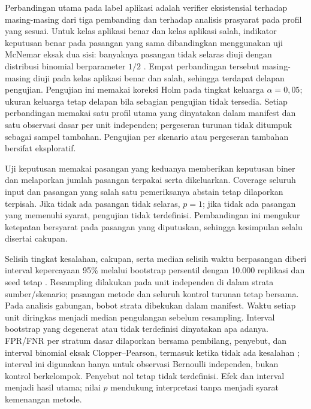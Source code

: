 Perbandingan utama pada label aplikasi adalah verifier eksistensial terhadap masing-masing dari tiga pembanding dan terhadap analisis prasyarat pada profil yang sesuai. Untuk kelas aplikasi benar dan kelas aplikasi salah, indikator keputusan benar pada pasangan yang sama dibandingkan menggunakan uji McNemar eksak dua sisi: banyaknya pasangan tidak selaras diuji dengan distribusi binomial berparameter $1/2$ \citep{rstats2026,rbinom2026}. Empat perbandingan tersebut masing-masing diuji pada kelas aplikasi benar dan salah, sehingga terdapat delapan pengujian. Pengujian ini memakai koreksi Holm pada tingkat keluarga $\alpha=0{,}05$; ukuran keluarga tetap delapan bila sebagian pengujian tidak tersedia. Setiap perbandingan memakai satu profil utama yang dinyatakan dalam manifest dan satu observasi dasar per unit independen; pergeseran turunan tidak ditumpuk sebagai sampel tambahan. Pengujian per skenario atau pergeseran tambahan bersifat eksploratif.

Uji keputusan memakai pasangan yang keduanya memberikan keputusan biner dan melaporkan jumlah pasangan terpakai serta dikeluarkan. Coverage seluruh input dan pasangan yang salah satu pemeriksanya abstain tetap dilaporkan terpisah. Jika tidak ada pasangan tidak selaras, $p=1$; jika tidak ada pasangan yang memenuhi syarat, pengujian tidak terdefinisi. Pembandingan ini mengukur ketepatan bersyarat pada pasangan yang diputuskan, sehingga kesimpulan selalu disertai cakupan.

Selisih tingkat kesalahan, cakupan, serta median selisih waktu berpasangan diberi interval kepercayaan 95\% melalui bootstrap persentil dengan 10.000 replikasi dan seed tetap \citep{rboot2026}. Resampling dilakukan pada unit independen di dalam strata sumber/skenario; pasangan metode dan seluruh kontrol turunan tetap bersama. Pada analisis gabungan, bobot strata dibekukan dalam manifest. Waktu setiap unit diringkas menjadi median pengulangan sebelum resampling. Interval bootstrap yang degenerat atau tidak terdefinisi dinyatakan apa adanya. FPR/FNR per stratum dasar dilaporkan bersama pembilang, penyebut, dan interval binomial eksak Clopper--Pearson, termasuk ketika tidak ada kesalahan \citep{rbinom2026}; interval ini digunakan hanya untuk observasi Bernoulli independen, bukan kontrol berkelompok. Penyebut nol tetap tidak terdefinisi. Efek dan interval menjadi hasil utama; nilai $p$ mendukung interpretasi tanpa menjadi syarat kemenangan metode.

